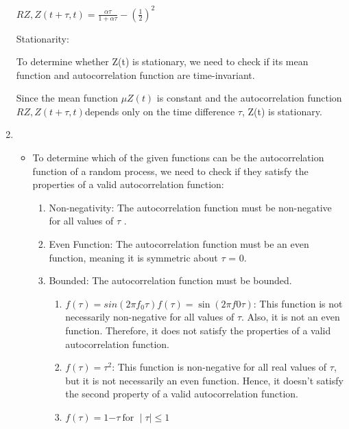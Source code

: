 \documentclass{article}
\begin{document}
\begin{enumerate}
    $RZ,Z(t + \tau,t) = \frac{\alpha\tau}{1 + \alpha\tau} - \left( \frac{1}{2} \right)^{2}$

    Stationarity:

    To determine whether Z(t) is stationary, we need to check if its mean
    function and autocorrelation function are time-invariant.

    Since the mean function \(\mu Z(t)\) is constant and the autocorrelation
    function \(RZ,Z(t + \tau,t)\)depends only on the time difference $\tau$,
    Z(t) is stationary.

\newpage
\item

    \begin{itemize}
    \item
    To determine which of the given functions can be the autocorrelation
    function of a random process, we need to check if they satisfy the
    properties of a valid autocorrelation function:

    \begin{enumerate}
    \def\labelenumi{\roman{enumi}.}
    \item
        Non-negativity: The autocorrelation function must be non-negative
        for all values of $\tau$ .
    \item
        Even Function: The autocorrelation function must be an even
        function, meaning it is symmetric about $\tau$ = 0.
    \item
        Bounded: The autocorrelation function must be bounded.

        \begin{enumerate}
        \def\labelenumii{\alph{enumii}.}
        \item
        \(f(\tau) = sin(2\pi f_{0}\tau)f(\tau) = \sin(2\pi f0\mathbf{}\tau)\):
        This function is not necessarily non-negative for all values of $\tau$.
        Also, it is not an even function. Therefore, it does not satisfy
        the properties of a valid autocorrelation function.
        \item
        \(f(\tau) = \tau^{2}\): This function is non-negative for all real
        values of $\tau$, but it is not necessarily an even function. Hence, it
        doesn't satisfy the second property of a valid autocorrelation
        function.
        \item
        \(f(\tau) = 1\mathbf{-}\tau\ \text{for~} \mid \tau \mid \leq 1\)
        \end{enumerate}
    \end{enumerate}
    \end{itemize}


\end{enumerate}
\end{document}
